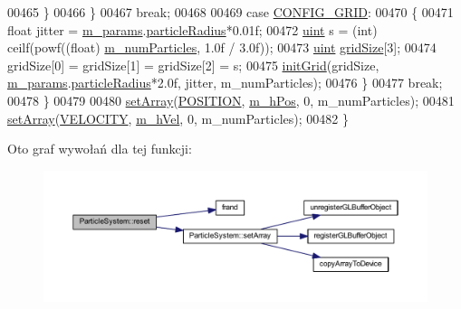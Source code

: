 \begin{DoxyCode}
00465                 \}
00466             \}
00467             \textcolor{keywordflow}{break};
00468 
00469         \textcolor{keywordflow}{case} \hyperlink{class_particle_system_a1dca3996c8068602412ef9f7826605d1aa6bd9e92edfc102877bf103547397b47}{CONFIG\_GRID}:
00470             \{
00471                 \textcolor{keywordtype}{float} jitter = \hyperlink{class_particle_system_ab765472aed6a1b5f0d2f98a3a906c417}{m\_params}.\hyperlink{struct_sim_params_a7e131c24e1020c44173deb0f57a8c4af}{particleRadius}*0.01f;
00472                 \hyperlink{particles__kernel_8cuh_a91ad9478d81a7aaf2593e8d9c3d06a14}{uint} s = (int) ceilf(powf((\textcolor{keywordtype}{float}) \hyperlink{class_particle_system_a23d238efa80a647d4b6cde034f486a91}{m\_numParticles}, 1.0f / 3.0f));
00473                 \hyperlink{particles__kernel_8cuh_a91ad9478d81a7aaf2593e8d9c3d06a14}{uint} \hyperlink{particles_8cpp_aefe301f4cc6d6838e3627b5970e855a9}{gridSize}[3];
00474                 gridSize[0] = gridSize[1] = gridSize[2] = s;
00475                 \hyperlink{class_particle_system_a2e08c4e354b0de5e2dc468a0fb457dfe}{initGrid}(gridSize, \hyperlink{class_particle_system_ab765472aed6a1b5f0d2f98a3a906c417}{m\_params}.\hyperlink{struct_sim_params_a7e131c24e1020c44173deb0f57a8c4af}{particleRadius}*2.0f, jitter, 
      m\_numParticles);
00476             \}
00477             \textcolor{keywordflow}{break};
00478     \}
00479 
00480     \hyperlink{class_particle_system_aa792a66680e800832059854aab0d594d}{setArray}(\hyperlink{class_particle_system_a332fbe57a36aaea5c18b4ea4fba6bbb3a9e9a2992d230a2674debf26e0e8e0299}{POSITION}, \hyperlink{class_particle_system_ab9d75471d2eaaeb8fa98d2f3f47d9c25}{m\_hPos}, 0, m\_numParticles);
00481     \hyperlink{class_particle_system_aa792a66680e800832059854aab0d594d}{setArray}(\hyperlink{class_particle_system_a332fbe57a36aaea5c18b4ea4fba6bbb3a3702de73065f01b4f6ffa604b799e53d}{VELOCITY}, \hyperlink{class_particle_system_a20560c896ee8a8bbc827a8e5902da7e2}{m\_hVel}, 0, m\_numParticles);
00482 \}
\end{DoxyCode}


Oto graf wywołań dla tej funkcji\-:\nopagebreak
\begin{figure}[H]
\begin{center}
\leavevmode
\includegraphics[width=350pt]{class_particle_system_a519070812dd9eb349f270c793c5f64b6_cgraph}
\end{center}
\end{figure}




